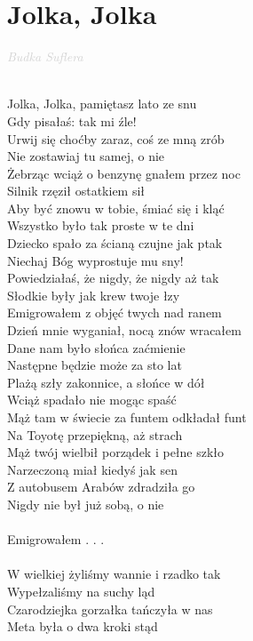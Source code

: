 \documentclass[a5paper, 10pt]{book}
\begin{document}
\section{Jolka, Jolka}\textcolor{lightgray}{\textit{Budka Suflera}}\\~\\
\begin{minipage}[t]{0.6\textwidth}
Jolka, Jolka, pamiętasz lato ze snu\\
Gdy pisałaś: tak mi źle!\\
Urwij się choćby zaraz, coś ze mną zrób\\
Nie zostawiaj tu samej, o nie\\

Żebrząc wciąż o benzynę gnałem przez noc\\
Silnik rzęził ostatkiem sił\\
Aby być znowu w tobie, śmiać się i kląć\\
Wszystko było tak proste w te dni\\

Dziecko spało za ścianą czujne jak ptak\\
Niechaj Bóg wyprostuje mu sny!\\
Powiedziałaś, że nigdy, że nigdy aż tak\\
Słodkie były jak krew twoje łzy\\

\hspace*{6mm}Emigrowałem z objęć twych nad ranem\\
\hspace*{6mm}Dzień mnie wyganiał, nocą znów wracałem\\
\hspace*{6mm}Dane nam było słońca zaćmienie\\
\hspace*{6mm}Następne będzie może za sto lat\\

Plażą szły zakonnice, a słońce w dół\\
Wciąż spadało nie mogąc spaść\\
Mąż tam w świecie za funtem odkładał funt\\
Na Toyotę przepiękną, aż strach\\

Mąż twój wielbił porządek i pełne szkło\\
Narzeczoną miał kiedyś jak sen\\
Z autobusem Arabów zdradziła go\\
Nigdy nie był już sobą, o nie\\
\\
\hspace*{6mm}Emigrowałem . . .\\
\\
W wielkiej żyliśmy wannie i rzadko tak\\
Wypełzaliśmy na suchy ląd\\
Czarodziejka gorzałka tańczyła w nas\\
Meta była o dwa kroki stąd\\


\end{minipage}
\end{document}
